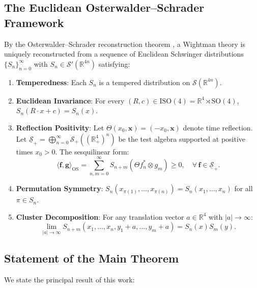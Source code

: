 \documentclass[11pt,reqno]{amsart}
\theoremstyle{plain}
\theoremstyle{definition}
\theoremstyle{remark}
\numberwithin{equation}{section}
\begin{document}
\subsection{The Euclidean Osterwalder--Schrader Framework}
By the Osterwalder--Schrader reconstruction theorem \cite{OsterwalderSchrader1973, OsterwalderSchrader1975}, a Wightman theory is uniquely reconstructed from a sequence of Euclidean Schwinger distributions $\{S_n\}_{n=0}^\infty$ with $S_n \in \mathcal{S}'(\mathbb{R}^{4n})$ satisfying:
\begin{enumerate}
    \item[\textbf{OS0}] \textbf{Temperedness}: Each $S_n$ is a tempered distribution on $\mathcal{S}(\mathbb{R}^{4n})$.
    \item[\textbf{OS1}] \textbf{Euclidean Invariance}: For every $(R, c) \in \mathrm{ISO}(4) = \mathbb{R}^4 \rtimes \mathrm{SO}(4)$, $S_n(R \cdot x + c) = S_n(x)$.
    \item[\textbf{OS2}] \textbf{Reflection Positivity}: Let $\Theta(x_0, \mathbf{x}) = (-x_0, \mathbf{x})$ denote time reflection. Let $\underline{\mathcal{S}}_+ = \bigoplus_{n=0}^\infty \mathcal{S}_+((\mathbb{R}_+^4)^n)$ be the test algebra supported at positive times $x_0 > 0$. The sesquilinear form:
    \begin{equation}
    \langle \mathbf{f}, \mathbf{g} \rangle_{\mathrm{OS}} = \sum_{n, m=0}^\infty S_{n+m}(\Theta f_n^* \otimes g_m) \ge 0, \quad \forall \, \mathbf{f} \in \underline{\mathcal{S}}_+.
    \end{equation}
    \item[\textbf{OS3}] \textbf{Permutation Symmetry}: $S_n(x_{\pi(1)}, \dots, x_{\pi(n)}) = S_n(x_1, \dots, x_n)$ for all $\pi \in S_n$.
    \item[\textbf{OS4}] \textbf{Cluster Decomposition}: For any translation vector $a \in \mathbb{R}^4$ with $|a| \to \infty$:
    \begin{equation}
    \lim_{|a| \to \infty} S_{n+m}(x_1, \dots, x_n, y_1 + a, \dots, y_m + a) = S_n(x) S_m(y).
    \end{equation}
\end{enumerate}

\subsection{Statement of the Main Theorem}
We state the principal result of this work:
\end{document}
